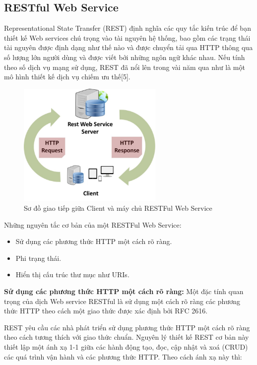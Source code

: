 \documentclass[11pt,a4paper,oneside]{book}
\begin{document}
\subsection{RESTful Web Service}

Representational State Transfer (REST) định nghĩa các quy tắc kiến trúc để bạn thiết kế Web services chú trọng vào tài nguyên hệ thống, bao gồm các trạng thái tài nguyên được định dạng như thế nào và được chuyển tải qua HTTP thông qua số lượng lớn người dùng và được viết bởi những ngôn ngữ khác nhau. Nếu tính theo số dịch vụ mạng sử dụng, REST đã nổi lên trong vài năm qua như là một mô hình thiết kế dịch vụ chiếm ưu thế[5].

\begin{figure}[h]
  \centering
     \includegraphics[width=7cm]{3-client-communicate-RESTfulWS}
  \caption{Sơ đồ giao tiếp giữa Client và máy chủ RESTFul Web Service}\label{fig:3-client-communicate-RESTfulWS}
\end{figure}

Những nguyên tắc cơ bản của một RESTFul Web Service:

\begin{itemize}[topsep=1mm,itemsep=-0.5mm]
\item Sử dụng các phương thức HTTP một cách rõ ràng.
\item Phi trạng thái.
\item Hiển thị cấu trúc thư mục như URIs.
\vspace{1mm}
\end{itemize}

\textbf{Sử dụng các phương thức HTTP một cách rõ ràng:} Một đặc tính quan trọng của dịch Web service RESTful là sử dụng một cách rõ ràng các phương thức HTTP theo cách một giao thức được xác định bởi RFC 2616.

REST yêu cầu các nhà phát triển sử dụng phương thức HTTP một cách rõ ràng theo cách tương thích với giao thức chuẩn. Nguyên lý thiết kế REST cơ bản này thiết lập một ánh xạ 1-1 giữa các hành động tạo, đọc, cập nhật và xoá (CRUD) các quá trình vận hành và các phương thức HTTP. Theo cách ánh xạ này thì:
\end{document}
